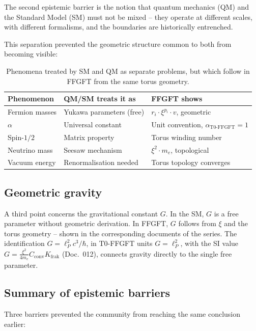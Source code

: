 The second epistemic barrier is the notion that quantum mechanics (QM)
and the Standard Model (SM) must not be mixed -- they operate at
different scales, with different formalisms, and the boundaries are
historically entrenched.

This separation prevented the geometric structure common to both from
becoming visible:

\begin{table}[htbp]
\centering\footnotesize
\begin{tabular}{lll}
\toprule
\textbf{Phenomenon} & \textbf{QM/SM treats it as} & \textbf{FFGFT shows} \\
\midrule
Fermion masses  & Yukawa parameters (free)  & $r_i \cdot \xi^{p_i} \cdot v$, geometric \\
$\alpha$        & Universal constant        & Unit convention, $\alpha_{\text{T0-FFGFT}}=1$ \\
Spin-$1/2$      & Matrix property           & Torus winding number \\
Neutrino mass   & Seesaw mechanism          & $\xi^2 \cdot m_e$, topological \\
Vacuum energy   & Renormalisation needed    & Torus topology converges \\
\bottomrule
\end{tabular}
\caption{Phenomena treated by SM and QM as separate problems,
but which follow in FFGFT from the same torus geometry.}
\label{tab:sm_qm_en}
\end{table}

\subsection{Geometric gravity}

A third point concerns the gravitational constant $G$. In the SM,
$G$ is a free parameter without geometric derivation. In FFGFT,
$G$ follows from $\xi$ and the torus geometry -- shown in the
corresponding documents of the series. The identification
$G = \ell_P^2 c^3/\hbar$, in T0-FFGFT units $G = \ell_P^2$, with the SI value $G = \frac{\xi^2}{4m_e}C_{\text{conv}}K_{\text{frak}}$ (Doc.~012),
connects gravity directly to
the single free parameter.

\subsection{Summary of epistemic barriers}

Three barriers prevented the community from reaching the same
conclusion earlier:

